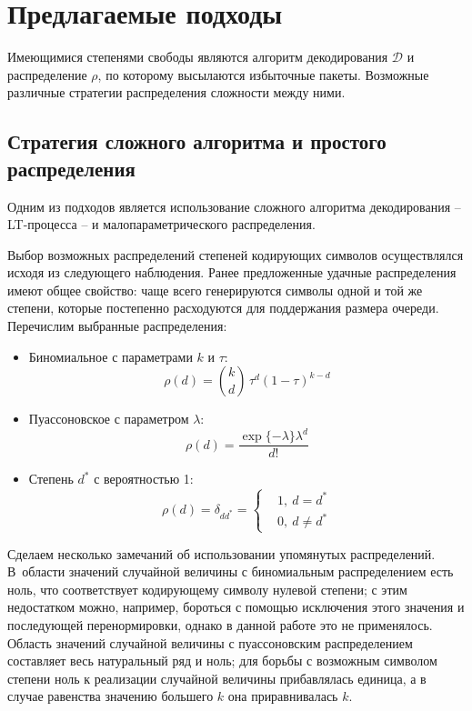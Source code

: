 \section{Предлагаемые подходы}

Имеющимися степенями свободы являются алгоритм декодирования $\mathcal D$
и распределение $\rho$, по которому высылаются избыточные пакеты.
Возможные различные стратегии распределения сложности между ними.

\subsection{Стратегия сложного алгоритма и простого распределения}

Одним из подходов является использование сложного алгоритма декодирования -- LT-процесса \cite{Luby} -- и малопараметрического распределения.

Выбор возможных распределений степеней кодирующих символов осуществлялся исходя из следующего наблюдения.
Ранее предложенные удачные распределения имеют общее свойство: чаще всего генерируются символы одной и той же степени, которые постепенно
расходуются для поддержания размера очереди.
Перечислим выбранные распределения:

\begin{itemize}

    \item Биномиальное с параметрами $k$ и $\tau$:
        \[
            \rho(d) = \binom{k}{d}\,\tau^d(1-\tau)^{k-d}
        \]
    \item Пуассоновское с параметром $\lambda$:
        \[
            \rho(d) = \frac{\exp\{-\lambda\}\lambda^d}{d!}
        \]
    \item Степень $d^*$ с вероятностью 1:
        \[
            \rho(d) = \delta_{dd^*} = 
            \left\{
            \begin{aligned}
                &1,\: d=d^*\\
                &0,\: d\ne d^*
            \end{aligned}
            \right.
        \]

\end{itemize}

Сделаем несколько замечаний об использовании упомянутых распределений.
В~области значений случайной величины с биномиальным распределением есть ноль, что соответствует кодирующему символу нулевой степени;
с этим недостатком можно, например, бороться с помощью исключения этого значения и последующей перенормировки, однако в данной работе это
не применялось.
Область значений случайной величины с пуассоновским распределением составляет весь натуральный ряд и ноль; для борьбы с возможным символом степени ноль к реализации случайной величины прибавлялась единица, а в случае равенства значению большего $k$ она приравнивалась $k$.

